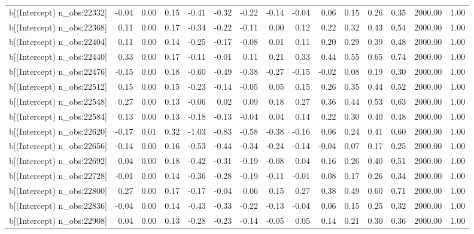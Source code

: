 \begin{table}[ht]
\begin{tabular}{rrrrrrrrrrrrrrr}
  b[(Intercept) n\_obs:22332] & -0.04 & 0.00 & 0.15 & -0.41 & -0.32 & -0.22 & -0.14 & -0.04 & 0.06 & 0.15 & 0.26 & 0.35 & 2000.00 & 1.00 \\ 
  b[(Intercept) n\_obs:22368] & 0.11 & 0.00 & 0.17 & -0.34 & -0.22 & -0.11 & 0.00 & 0.12 & 0.22 & 0.32 & 0.43 & 0.54 & 2000.00 & 1.00 \\ 
  b[(Intercept) n\_obs:22404] & 0.11 & 0.00 & 0.14 & -0.25 & -0.17 & -0.08 & 0.01 & 0.11 & 0.20 & 0.29 & 0.39 & 0.48 & 2000.00 & 1.00 \\ 
  b[(Intercept) n\_obs:22440] & 0.33 & 0.00 & 0.17 & -0.11 & -0.01 & 0.11 & 0.21 & 0.33 & 0.44 & 0.55 & 0.65 & 0.74 & 2000.00 & 1.00 \\ 
  b[(Intercept) n\_obs:22476] & -0.15 & 0.00 & 0.18 & -0.60 & -0.49 & -0.38 & -0.27 & -0.15 & -0.02 & 0.08 & 0.19 & 0.30 & 2000.00 & 1.00 \\ 
  b[(Intercept) n\_obs:22512] & 0.15 & 0.00 & 0.15 & -0.23 & -0.14 & -0.05 & 0.05 & 0.15 & 0.26 & 0.35 & 0.44 & 0.52 & 2000.00 & 1.00 \\ 
  b[(Intercept) n\_obs:22548] & 0.27 & 0.00 & 0.13 & -0.06 & 0.02 & 0.09 & 0.18 & 0.27 & 0.36 & 0.44 & 0.53 & 0.63 & 2000.00 & 1.00 \\ 
  b[(Intercept) n\_obs:22584] & 0.13 & 0.00 & 0.13 & -0.18 & -0.13 & -0.04 & 0.04 & 0.14 & 0.22 & 0.30 & 0.40 & 0.48 & 2000.00 & 1.00 \\ 
  b[(Intercept) n\_obs:22620] & -0.17 & 0.01 & 0.32 & -1.03 & -0.83 & -0.58 & -0.38 & -0.16 & 0.06 & 0.24 & 0.41 & 0.60 & 2000.00 & 1.00 \\ 
  b[(Intercept) n\_obs:22656] & -0.14 & 0.00 & 0.16 & -0.53 & -0.44 & -0.34 & -0.24 & -0.14 & -0.04 & 0.07 & 0.17 & 0.25 & 2000.00 & 1.00 \\ 
  b[(Intercept) n\_obs:22692] & 0.04 & 0.00 & 0.18 & -0.42 & -0.31 & -0.19 & -0.08 & 0.04 & 0.16 & 0.26 & 0.40 & 0.51 & 2000.00 & 1.00 \\ 
  b[(Intercept) n\_obs:22728] & -0.01 & 0.00 & 0.14 & -0.36 & -0.28 & -0.19 & -0.11 & -0.01 & 0.08 & 0.17 & 0.26 & 0.34 & 2000.00 & 1.00 \\ 
  b[(Intercept) n\_obs:22800] & 0.27 & 0.00 & 0.17 & -0.17 & -0.04 & 0.06 & 0.15 & 0.27 & 0.38 & 0.49 & 0.60 & 0.71 & 2000.00 & 1.00 \\ 
  b[(Intercept) n\_obs:22836] & -0.04 & 0.00 & 0.14 & -0.43 & -0.33 & -0.22 & -0.13 & -0.04 & 0.06 & 0.15 & 0.25 & 0.32 & 2000.00 & 1.00 \\ 
  b[(Intercept) n\_obs:22908] & 0.04 & 0.00 & 0.13 & -0.28 & -0.23 & -0.14 & -0.05 & 0.05 & 0.14 & 0.21 & 0.30 & 0.36 & 2000.00 & 1.00 \\ 

\end{tabular}
\end{table}
